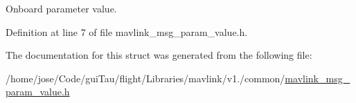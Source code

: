 Onboard parameter value. 



Definition at line 7 of file mavlink\-\_\-msg\-\_\-param\-\_\-value.\-h.



The documentation for this struct was generated from the following file\-:\begin{DoxyCompactItemize}
\item 
/home/jose/\-Code/gui\-Tau/flight/\-Libraries/mavlink/v1./common/\hyperlink{mavlink__msg__param__value_8h}{mavlink\-\_\-msg\-\_\-param\-\_\-value.\-h}\end{DoxyCompactItemize}
